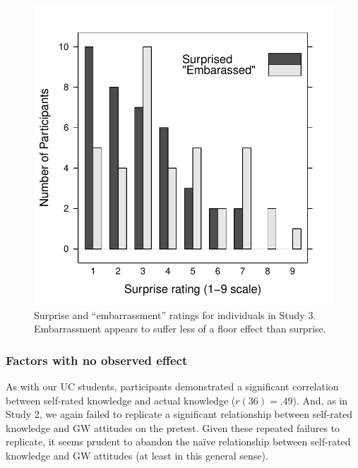 \begin{figure}
    \centering
    \includegraphics{CCO-mech-surprise-by-question.pdf}
    \caption{Surprise and “embarrassment” ratings for individuals in Study 3.
        Embarrassment appears to suffer less of a floor effect than surprise.}
    \label{fig:CCO-mech-surprise}
\end{figure}


\subsubsection{Factors with no observed effect}

As with our UC students, participants demonstrated a significant correlation
between self-rated knowledge and actual knowledge ($r(36)=.49$).  And, as in
Study 2, we again failed to replicate a significant relationship between
self-rated knowledge and GW attitudes on the pretest. Given these repeated
failures to replicate, it seems prudent to abandon the naïve relationship
between self-rated knowledge and GW attitudes (at least in this general sense).


